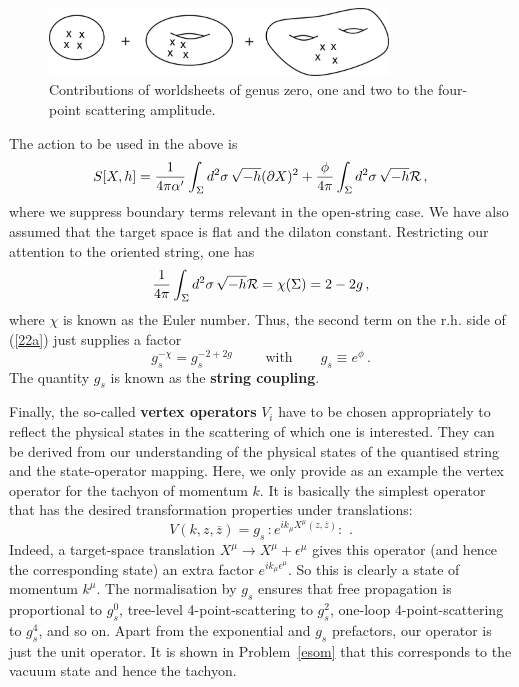 \documentclass[12pt]{article}
\newcommand{\be}{\begin{equation}}
\newcommand{\ee}{\end{equation}}
\newcommand{\ol}{\overline}
\numberwithin{equation}{section}
\begin{document}
\begin{figure}[ht]
\begin{center} 
\includegraphics[width=9cm]{rie.png}
\caption{
Contributions of worldsheets of genus zero, one and two to the four-point scattering amplitude.}
\label{rie} 
\end{center}
\end{figure}

The action to be used in the above is
\be
S[X,h]=\frac{1}{4\pi\alpha'}\int_\Sigma d^2\sigma\,\sqrt{-h}(\partial X)^2+\frac{\phi}{4\pi}\int_\Sigma d^2\sigma\,\sqrt{-h}{\cal R}\,,\label{22a}
\ee
where we suppress boundary terms relevant in the open-string case. We have also assumed that the target space is flat and the dilaton constant. Restricting our attention to the oriented string, one has
\be
\frac{1}{4\pi}\int_\Sigma d^2\sigma\,\sqrt{-h}{\cal R}=\chi(\Sigma)=2-2g\,,
\ee
where $\chi$ is known as the Euler number. Thus, the second term on the r.h. side of (\ref{22a}) just supplies a factor
\be
g_s^{-\chi}=g_s^{-2+2g}\,\,\qquad\mbox{with}\qquad g_s\equiv e^{\phi}\,.
\ee
The quantity $g_s$ is known as the {\bf string coupling}.

Finally, the so-called {\bf vertex operators} $V_i$ have to be chosen appropriately to reflect the physical states in the scattering of which one is interested. They can be derived from our understanding of the physical states of the quantised string and the state-operator mapping. Here, we only provide as an example the vertex operator for the tachyon of momentum $k$. It is basically the simplest operator that has the desired transformation properties under translations:
\be
V(k,z,\ol{z})=g_s\,:e^{ik_\mu X^\mu(z,\ol{z})}:\,\,.
\ee
Indeed, a target-space translation $X^\mu\to X^\mu+\epsilon^\mu$ gives this operator (and hence the corresponding state) an extra factor $e^{ik_\mu \epsilon^\mu}$. So this is clearly a state of momentum $k^\mu$. The normalisation by $g_s$ ensures that free propagation is proportional to $g_s^0$, tree-level 4-point-scattering to $g_s^2$, one-loop 4-point-scattering to $g_s^4$, and so on. Apart from the exponential and $g_s$ prefactors, our operator is just the unit operator. It is shown in Problem~\ref{esom} that this corresponds to the vacuum state and hence the tachyon.
\end{document}
